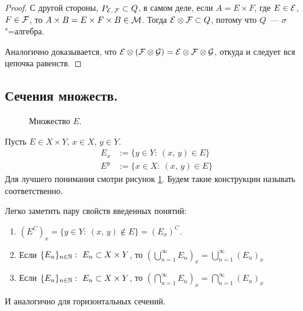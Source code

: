 \begin{claim}
\begin{proof}
        С другой стороны, $P_{\mathcal{E},\, \mathcal{F} }\subset Q$, в самом деле, если $A=E\times F$, где $E\in\mathcal{E}$, $F\in\mathcal{F} $, то
        $A\times B = E\times F\times B\in \mathcal{M}$.
        Тогда $\mathcal{E}\otimes\mathcal{F} \subset Q$, потому что $Q$~--- $\sigma$"=алгебра.

        Аналогично доказывается, что $\mathcal{E}\otimes(\mathcal{F} \otimes\mathcal{G})=\mathcal{E}\otimes\mathcal{F} \otimes\mathcal{G}$, откуда и следует вся
        цепочка равенств.

    \end{proof}
\end{claim}

\subsection{Сечения множеств.}

\begin{figure}[!ht]
    \centering
    
    \caption{Множество $E$.}
    \label{lect4:fig:mult}
\end{figure}

\begin{definition}
    Пусть $E\in X\times Y,\, x\in X,\, y\in Y$. 
    \begin{align*}
        E_x&:=\{y\in Y:\ (x,\, y)\in E\}\\
        E^y&:=\{x\in X:\ (x,\, y)\in E\}
    \end{align*}
    Для лучшего понимания смотри рисунок \ref{lect4:fig:mult}. Будем такие конструкции называть  соответственно.
\end{definition}

\begin{remark}
    Легко заметить пару свойств введенных понятий:
    \begin{enumerate}[label=\arabic*\degree.]
        \item $(E^C)_x = \{y\in Y:\ (x,\, y)\notin E\}=(E_x)^C.$
        \item Если $\{E_n\}_{n\in\mathbb{N}}:\ E_n\subset X\times Y$, то 
        $\left(\bigcup\limits_{n=1}^{\infty}E_n\right)_x=\bigcup\limits_{n=1}^{\infty}\left(E_n\right)_x$
        \item Если $\{E_n\}_{n\in\mathbb{N}}:\ E_n\subset X\times Y$, то 
        $\left(\bigcap\limits_{n=1}^{\infty}E_n\right)_x=\bigcap\limits_{n=1}^{\infty}\left(E_n\right)_x$
    \end{enumerate}
    И аналогично для горизонтальных сечений.
\end{remark}

